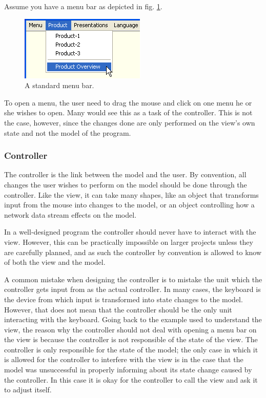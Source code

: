 Assume you have a menu bar as depicted in fig. \ref{fig:menubar}.

\begin{figure}[H]
\begin{centering}
\includegraphics{MenuBar}
\par\end{centering}

\caption{\label{fig:menubar}A standard menu bar.}
\end{figure}


To open a menu, the user need to drag the mouse and click on one menu
he or she wishes to open. Many would see this as a task of the controller.
This is not the case, however, since the changes done are only performed
on the view's own state and not the model of the program.


\subsubsection{Controller}

The controller is the link between the model and the user. By convention,
all changes the user wishes to perform on the model should be done
through the controller. Like the view, it can take many shapes, like
an object that transforms input from the mouse into changes to the
model, or an object controlling how a network data stream effects
on the model. 

In a well-designed program the controller should never have to interact
with the view. However, this can be practically impossible on larger
projects unless they are carefully planned, and as such the controller
by convention is allowed to know of both the view and the model.

A common mistake when designing the controller is to mistake the unit
which the controller gets input from as the actual controller. In
many cases, the keyboard is the device from which input is transformed
into state changes to the model. However, that does not mean that
the controller should be the only unit interacting with the keyboard.
Going back to the example used to understand the view, the reason
why the controller should not deal with opening a menu bar on the
view is because the controller is not responsible of the state of
the view. The controller is only responsible for the state of the
model; the only case in which it is allowed for the controller to
interfere with the view is in the case that the model was unsuccessful
in properly informing about its state change caused by the controller.
In this case it is okay for the controller to call the view and ask
it to adjust itself. 

